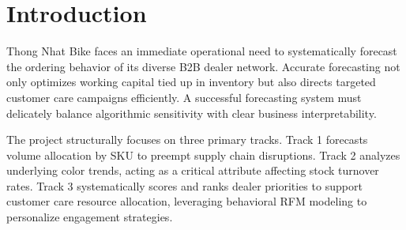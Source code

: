 \section{Introduction}
Thong Nhat Bike faces an immediate operational need to systematically forecast the ordering behavior of its diverse B2B dealer network. Accurate forecasting not only optimizes working capital tied up in inventory but also directs targeted customer care campaigns efficiently. A successful forecasting system must delicately balance algorithmic sensitivity with clear business interpretability.

The project structurally focuses on three primary tracks. Track 1 forecasts volume allocation by SKU to preempt supply chain disruptions. Track 2 analyzes underlying color trends, acting as a critical attribute affecting stock turnover rates. Track 3 systematically scores and ranks dealer priorities to support customer care resource allocation, leveraging behavioral RFM modeling to personalize engagement strategies.
\FloatBarrier
